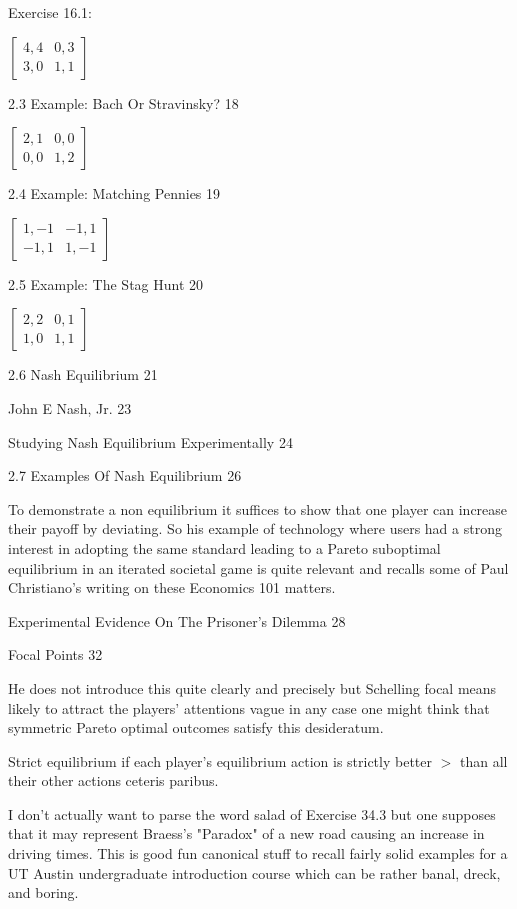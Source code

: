 Exercise 16.1:

$
\begin{bmatrix}
4,4 & 0,3 \\
3,0 & 1,1
\end{bmatrix}
$

2.3 Example: Bach Or Stravinsky? 18

$
\begin{bmatrix}
2,1 & 0,0 \\
0,0 & 1,2
\end{bmatrix}
$

2.4 Example: Matching Pennies 19

$
\begin{bmatrix}
1,-1 & -1,1 \\
-1,1 & 1,-1
\end{bmatrix}
$

2.5 Example: The Stag Hunt 20

$
\begin{bmatrix}
2,2 & 0,1 \\
1,0 & 1,1
\end{bmatrix}
$

2.6 Nash Equilibrium 21



John E Nash, Jr. 23



Studying Nash Equilibrium Experimentally 24



2.7 Examples Of Nash Equilibrium 26

To demonstrate a non equilibrium it suffices to show that one player can increase their payoff by deviating. So his example of technology where users had a strong interest in adopting the same standard leading to a Pareto suboptimal equilibrium in an iterated societal game is quite relevant and recalls some of Paul Christiano's writing on these Economics 101 matters.

Experimental Evidence On The Prisoner's Dilemma 28



Focal Points 32

He does not introduce this quite clearly and precisely but Schelling focal means likely to attract the players' attentions vague in any case one might think that symmetric Pareto optimal outcomes satisfy this desideratum.

Strict equilibrium if each player's equilibrium action is strictly better $>$ than all their other actions ceteris paribus.

I don't actually want to parse the word salad of Exercise 34.3 but one supposes that it may represent Braess's "Paradox" of a new road causing an increase in driving times. This is good fun canonical stuff to recall fairly solid examples for a UT Austin undergraduate introduction course which can be rather banal, dreck, and boring.

